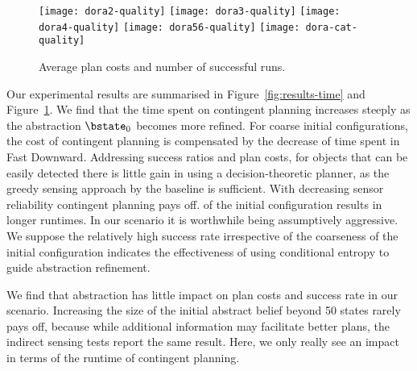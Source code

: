 \begin{figure}[h!]
  \texttt{[image: dora2-quality]}\hfill
  \vspace{2mm}
  \texttt{[image: dora3-quality]}\hfill
  \vspace{2mm}
  \texttt{[image: dora4-quality]}\hfill
  \vspace{2mm}
  \texttt{[image: dora56-quality]}\hfill
  \vspace{2mm}
  \texttt{[image: dora-cat-quality]}\hfill
  \caption{Average plan costs and number of successful runs.}
  \label{fig:results-quality}
\end{figure}




Our experimental results are summarised in
Figure~\ref{fig:results-time} and Figure~\ref{fig:results-quality}. We
find that the time spent on contingent planning increases steeply as
the abstraction $\bstate_0$ becomes more refined. For coarse initial
configurations, the cost of contingent planning is compensated by the
decrease of time spent in Fast Downward. Addressing success ratios and
plan costs, for objects that can be easily detected there is little
gain in using a decision-theoretic planner, as the greedy sensing
approach by the baseline is sufficient. With decreasing sensor
reliability contingent planning pays off.%
of the initial configuration results in longer runtimes. In our
scenario it is worthwhile being assumptively aggressive.  We suppose
the relatively high success rate irrespective of the coarseness of the
initial configuration indicates the effectiveness of using conditional
entropy to guide abstraction refinement.

We find that abstraction has little impact on plan
costs and success rate in our scenario. Increasing the size of the
initial abstract belief beyond 50 states rarely pays off, because
while additional information may facilitate better plans, the indirect
sensing tests report the same result. Here, we only really see an
impact in terms of the runtime of contingent planning. 


